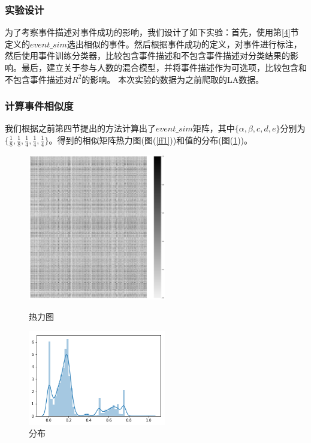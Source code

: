 \documentclass[12pt]{template}
\begin{document}
\subsubsection{实验设计}
为了考察事件描述对事件成功的影响，我们设计了如下实验：首先，使用第\ref{4}节定义的\(event\_sim\)选出相似的事件。然后根据事件成功的定义，对事件进行标注，然后使用事件训练分类器，比较包含事件描述和不包含事件描述对分类结果的影响。最后，建立关于参与人数的混合模型，并将事件描述作为可选项，比较包含和不包含事件描述对\(R^2\)的影响。
本次实验的数据为之前爬取的LA数据。

\subsubsection{计算事件相似度}
我们根据之前第四节提出的方法计算出了\(event\_sim\)矩阵，其中\(\{\alpha,\beta,{c},{d},{e}\}\)分别为\(\{\frac{1}{8},\frac{1}{8},\frac{1}{4},\frac{1}{4},\frac{1}{4}\}\)。得到的相似矩阵热力图(图(\ref{ff1}))和值的分布(图(\ref{ff2}))。

\begin{figure}[htbp]
  \centering
  \begin{minipage}[t]{0.48\textwidth}
  \centering
  \includegraphics[width=6cm]{event_sim.png}
  \caption{热力图}
  \label{ff1}
  \end{minipage}
  \begin{minipage}[t]{0.48\textwidth}
  \centering
  \includegraphics[width=6cm]{event_sim_dist.png}
  \caption{分布}
  \label{ff2}
  \end{minipage}
\end{figure}
\end{document}

